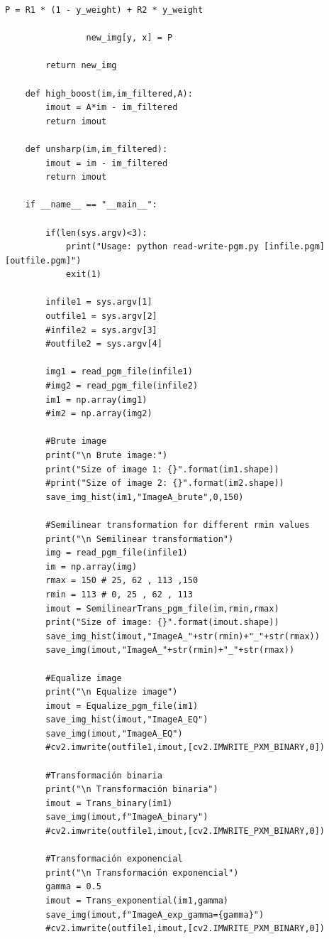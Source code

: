 \documentclass[letterpaper,12pt]{article}
\theoremstyle{plain}
\begin{document}
\begin{onecolumn}
\begin{lstlisting}[style=mystyle]
                P = R1 * (1 - y_weight) + R2 * y_weight
    
                new_img[y, x] = P
    
        return new_img
    
    def high_boost(im,im_filtered,A):
        imout = A*im - im_filtered
        return imout
    
    def unsharp(im,im_filtered):
        imout = im - im_filtered
        return imout
    
    if __name__ == "__main__":
        
        if(len(sys.argv)<3):
            print("Usage: python read-write-pgm.py [infile.pgm] [outfile.pgm]")
            exit(1)
    
        infile1 = sys.argv[1]
        outfile1 = sys.argv[2]
        #infile2 = sys.argv[3]
        #outfile2 = sys.argv[4]
        
        img1 = read_pgm_file(infile1)
        #img2 = read_pgm_file(infile2)
        im1 = np.array(img1)
        #im2 = np.array(img2)
        
        #Brute image 
        print("\n Brute image:")
        print("Size of image 1: {}".format(im1.shape))
        #print("Size of image 2: {}".format(im2.shape))
        save_img_hist(im1,"ImageA_brute",0,150)
    
        #Semilinear transformation for different rmin values
        print("\n Semilinear transformation")
        img = read_pgm_file(infile1)
        im = np.array(img)
        rmax = 150 # 25, 62 , 113 ,150
        rmin = 113 # 0, 25 , 62 , 113 
        imout = SemilinearTrans_pgm_file(im,rmin,rmax)
        print("Size of image: {}".format(imout.shape))
        save_img_hist(imout,"ImageA_"+str(rmin)+"_"+str(rmax))
        save_img(imout,"ImageA_"+str(rmin)+"_"+str(rmax))
    
        #Equalize image
        print("\n Equalize image")
        imout = Equalize_pgm_file(im1)
        save_img_hist(imout,"ImageA_EQ")    
        save_img(imout,"ImageA_EQ")    
        #cv2.imwrite(outfile1,imout,[cv2.IMWRITE_PXM_BINARY,0])
    
        #Transformación binaria
        print("\n Transformación binaria")
        imout = Trans_binary(im1)
        save_img(imout,f"ImageA_binary")
        #cv2.imwrite(outfile1,imout,[cv2.IMWRITE_PXM_BINARY,0])
    
        #Transformación exponencial
        print("\n Transformación exponencial")
        gamma = 0.5
        imout = Trans_exponential(im1,gamma)
        save_img(imout,f"ImageA_exp_gamma={gamma}")
        #cv2.imwrite(outfile1,imout,[cv2.IMWRITE_PXM_BINARY,0])
        

\end{lstlisting}
\end{onecolumn}
\end{document}
